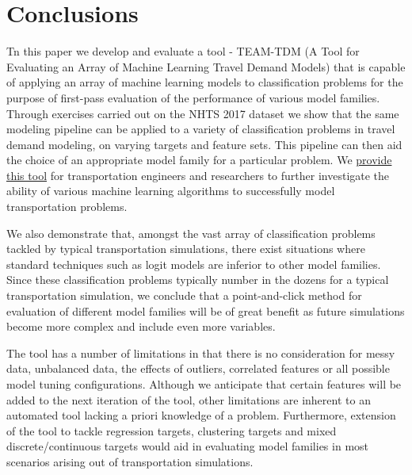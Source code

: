 \documentclass[numbered]{trbunofficial}
\begin{document}
\section{Conclusions}\label{section:conclusions}
 
 Tn this paper we develop and evaluate a tool - TEAM-TDM (A Tool for Evaluating an Array of Machine Learning Travel Demand Models) that is capable of applying an array of machine learning models to classification problems for the purpose of first-pass evaluation of the performance of various model families.
 Through exercises carried out on the NHTS 2017  dataset we show that the same modeling pipeline can be applied to a variety of classification problems in travel demand modeling, on varying targets and feature sets.
 This pipeline can then aid the choice of an appropriate model family for a particular problem.
 We \href{https://github.com/NREL/TEAM-TDM}{provide this tool} for transportation engineers and researchers to further investigate the ability of various machine learning algorithms to successfully model transportation problems.

We also demonstrate that, amongst the vast array of classification problems tackled by typical transportation simulations, there exist situations where standard techniques such as logit models are inferior to other model families.
 Since these classification problems typically number in the dozens for a typical transportation simulation, we conclude that a point-and-click method for evaluation of different model families will be of great benefit as future simulations become more complex and include even more variables.

The tool has a number of limitations in that there is no consideration for messy data, unbalanced data, the effects of outliers, correlated features or all possible model tuning configurations. 
 Although we anticipate that certain features will be added to the next iteration of the tool, other limitations are inherent to an automated tool lacking a priori knowledge of a problem. 
 Furthermore, extension of the tool to tackle regression targets, clustering targets and mixed discrete/continuous targets would aid in evaluating model families in most scenarios arising out of transportation simulations.




\end{document}
